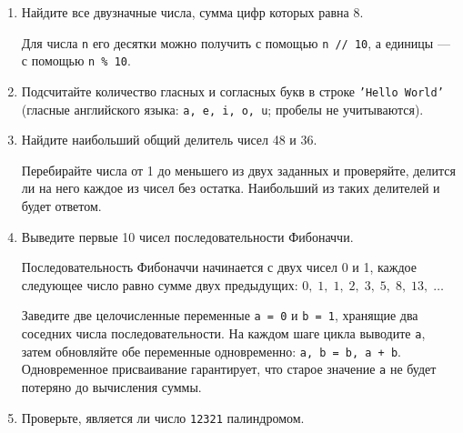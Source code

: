 \documentclass[a4,12pt]{article}
\theoremstyle{remark}
\begin{document}
\begin{enumerate}
    \item Найдите все двузначные числа, сумма цифр которых равна 8.

    \begin{exercisehint}
        Для числа \texttt{n} его десятки можно получить с помощью \texttt{n~//~10},
        а единицы — с помощью \texttt{n~\%~10}.
    \end{exercisehint}

    \item Подсчитайте количество гласных и согласных букв в строке \texttt{'Hello World'}
    (гласные английского языка: \texttt{a, e, i, o, u}; пробелы не учитываются).

    \item Найдите наибольший общий делитель чисел 48 и 36.

    \begin{exercisehint}
        Перебирайте числа от 1 до меньшего из двух заданных и проверяйте,
        делится ли на него каждое из чисел без остатка. Наибольший из таких
        делителей и будет ответом.
    \end{exercisehint}

    \item Выведите первые 10 чисел последовательности Фибоначчи.
    
    \begin{exercisehint}
        Последовательность Фибоначчи начинается с двух чисел 0 и 1,
    каждое следующее число равно сумме двух предыдущих:
    $0,\; 1,\; 1,\; 2,\; 3,\; 5,\; 8,\; 13,\; \ldots$

    Заведите две целочисленные переменные \texttt{a = 0} и \texttt{b = 1},
    хранящие два соседних числа последовательности.
    На каждом шаге цикла выводите \texttt{a}, затем обновляйте
    обе переменные одновременно: \texttt{a, b = b, a + b}.
    Одновременное присваивание гарантирует, что старое значение
    \texttt{a} не будет потеряно до вычисления суммы.
    \end{exercisehint}

    \item Проверьте, является ли число \texttt{12321} палиндромом.
    

\end{enumerate}
\end{document}

